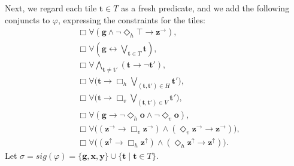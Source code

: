 \documentclass{lmcs} %
\theoremstyle{plain}\newtheorem{satz}[thm]{Satz} %
\newcommand{\sig}{\mathit{sig}}
\newcommand{\bbvarup}{\Zvar^\uparrow}
\newcommand{\bbvarright}{\Zvar^\to}
\newcommand{\Dht}[1]{\Diamond_h{#1}}
\newcommand{\Dvt}[1]{\Diamond_v{#1}}
\newcommand{\Bht}[1]{\Box_h{#1}}
\newcommand{\Bvt}[1]{\Box_v{#1}}
\newcommand{\fform}[1]{\boldsymbol{#1}}
\newcommand{\gvar}{\fform{g}}
\newcommand{\tvar}{\fform{t}}
\newcommand{\xvar}{\fform{x}}
\newcommand{\yvar}{\fform{y}}
\newcommand{\ovar}{\fform{o}}
\newcommand{\Zvar}{\fform{z}}
\newcommand{\Bv}{\forall}
\newcommand{\Bh}{\Box}
\begin{document}
%
Next, we regard each tile $\tvar\in T$ as a fresh predicate, and we add the following conjuncts to $\varphi$, expressing the constraints for the tiles: 
%
\begin{align}
	\label{vedge}
	& \Bh\Bv (\gvar \wedge \neg \Dht{\top} \rightarrow \bbvarright),\\
	\label{tile1}	
	& \Bh\Bv (\gvar \leftrightarrow \bigvee_{\tvar\in T}\tvar),\\
%
\label{tile2}		
	&  \Bh\Bv \bigwedge_{\tvar\not=\tvar'}(\tvar\rightarrow \neg \tvar'),\\
       \label{tile3}	
	& \Bh\Bv \bigl(\tvar \rightarrow \Bht{\bigvee_{(\tvar,\tvar')\in H} \tvar'}\bigr),\\
	\label{tile4}	
	& \Bh\Bv \bigl(\tvar \rightarrow \Bvt{\bigvee_{(\tvar,\tvar')\in V} \tvar'}\bigr),\\	
	\label{ounique}
	& \Bh\Bv(\gvar\to\neg\Dht\ovar\land\neg\Dvt\ovar),\\
	\label{tilelast1}
	& \Bh\Bv \bigl((\bbvarright \rightarrow \Bvt{\bbvarright})
	\wedge (\Dvt{\bbvarright} \rightarrow \bbvarright)\bigr),\\
	\label{tilelast2}	
	& \Bh\Bv \bigl((\bbvarup \rightarrow \Bht{\bbvarup})
	\wedge (\Dht{\bbvarup}\rightarrow \bbvarup)\bigr).
\end{align}
%
%
Let $\sigma=\sig(\varphi)=\{\gvar,\xvar,\yvar\}\cup\{\tvar\mid\tvar\in T\}$.
\end{document}
